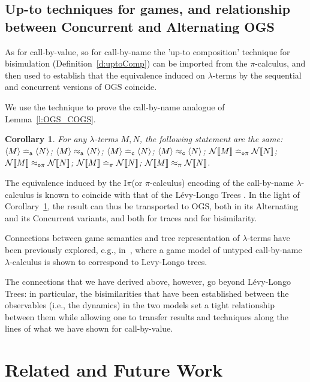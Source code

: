 \documentclass[11pt,a4paper]{amsart}
\theoremstyle{plain}
\theoremstyle{definition}
\theoremstyle{defC}
\theoremstyle{thmC}
\theoremstyle{plain}
\numberwithin{equation}{section}
\newcommand{\AOGS}{\mbox{{\rm A-OGS}}\xspace}      %
\newcommand{\COGS}{\mbox{{\rm C-OGS}}\xspace}      %
\newcommand{\rmm}[1]{{\tt{\lowercase{#1}}}}
\newcommand{\genTE}[1]{\mathrel{\bumpeq_{\rmm{\lowercase{#1}}}}}       %
\newcommand{\genwb}[1]{\mathrel{\approx_{\rmm{\lowercase{#1}}}}}       %
\newcommand{\wbPI}{\genwb{\pi}}       %
\newcommand{\wbOPI}{\genwb{o\pi}}       %
\newcommand{\wbC}{\genwb{C}}       %
\newcommand{\wbA}{\genwb{A}}       %
\newcommand{\TEPI}{\genTE{\pi}}       %
\newcommand{\TEN}{\genTE{o\pi}}     %
\newcommand{\TEA}{\genTE{A}}       %
\newcommand{\TEp}{\genTE{C}}       %
\newcommand{\encoN}[1]{{\mathcal {N}} [\! [ #1 ] \! ]  }
\newcommand{\Intp}{\mbox{I$\pi$}\xspace}   %
\newcommand{\piI}{\Intp}   %
\newcommand{\conf}[1]{\langle #1\rangle}
\theoremstyle{plain}
\newtheorem{corollary}[thm]{Corollary}
\theoremstyle{definition}
\begin{document}
\subsection{Up-to techniques for games, and relationship between Concurrent and Alternating OGS}
\label{ss:upto_games_cbn}

As for call-by-value, so for call-by-name the 
'up-to
  composition' technique for bisimulation 
(Definition~\ref{d:uptoComp}) 
can be imported from the $\pi$-calculus, and then used to establish that the equivalence
induced on $\lambda$-terms by the sequential and concurrent versions of OGS  coincide. 

We use  the technique to prove the call-by-name analogue of 
Lemma~\ref{l:OGS_COGS}. 



\begin{corollary}
\label{c:OGS_COGS_cbn}
For any   $\lambda$-terms $M,N$, the following statement are the same: 
$\conf{M} \TEA \conf {N}$;
$\conf{M} \wbA \conf {N}$;
$\conf{M} \TEp \conf {N}$;
$\conf{M} \wbC \conf {N}$;
$\encoN {{M} } \TEN\encoN {{N}}$; 
$\encoN {{M}} \wbOPI \encoN {{N}}$; 
$\encoN {{M} } \TEPI\encoN {{N}}$; 
$\encoN {{M}} \wbPI \encoN {{N}}$. 
\end{corollary} 
\noindent
The equivalence induced by the \piI (or  $\pi$-calculus) encoding of the call-by-name
$\lambda$-calculus is known to coincide with    that of the  
 L{\'e}vy-Longo Trees \cite{San95lazy}.  In the light of  
Corollary~\ref{c:OGS_COGS_cbn}, the result can thus be transported to OGS, both 
in its Alternating and its Concurrent variants, 
and both for traces and for bisimilarity.

Connections between game semantics and tree representation of $\lambda$-terms
have been previously explored, e.g.,  in~\cite{ong2004games}, 
where a game model of untyped call-by-name $\lambda$-calculus
is shown to correspond to Levy-Longo trees.

The connections that we have derived above, however, go beyond
L{\'e}vy-Longo Trees:
in particular,
the bisimilarities that have been established
between the observables (i.e., the dynamics) in the two models
set a tight relationship between them 
while allowing one to transfer results and techniques along the lines of what we have
shown for call-by-value.  

\section{Related and Future Work}
\label{s:cf}
              
\end{document}
